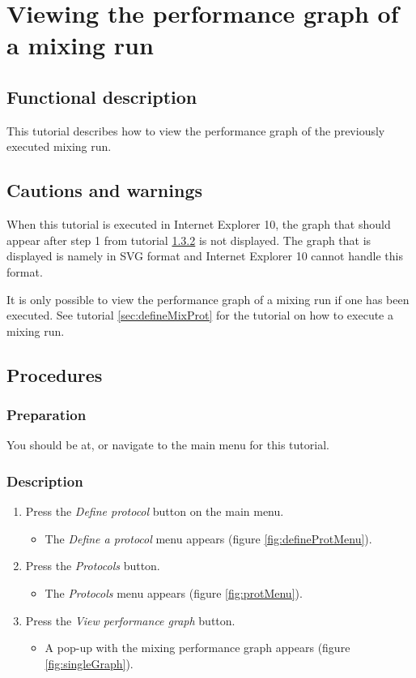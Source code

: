 
\section{Viewing the performance graph of a mixing run}
\label{sec:viewsinglegraph}

\subsection{Functional description}
This tutorial describes how to view the performance graph of the previously executed mixing run.

\subsection{Cautions and warnings}
When this tutorial is executed in Internet Explorer 10, the graph that should appear after step 1 from tutorial  \ref{subsubsec:viewsinglegraphDesc} is not displayed. The graph that is displayed is namely in SVG format and Internet Explorer 10 cannot handle this format.

It is only possible to view the performance graph of a mixing run if one has been executed. See tutorial \ref{sec:defineMixProt} for the tutorial on how to execute a mixing run.

\subsection{Procedures}

\subsubsection{Preparation}
You should be at, or navigate to the main menu for this tutorial.

\subsubsection{Description}\label{subsubsec:viewsinglegraphDesc}
\begin{enumerate}
	\item Press the \emph{Define protocol} button on the main menu.
		\begin{itemize}
            \item The \emph{Define a protocol} menu appears (figure \ref{fig:defineProtMenu}).
		\end{itemize}
	\item Press the \emph{Protocols} button.
		\begin{itemize}
			\item The \emph{Protocols} menu appears (figure \ref{fig:protMenu}).
		\end{itemize}
	\item Press the \emph{View performance graph} button.
		\begin{itemize}
			\item A pop-up with the mixing performance graph appears (figure \ref{fig:singleGraph}).
		\end{itemize}	
\end{enumerate}

